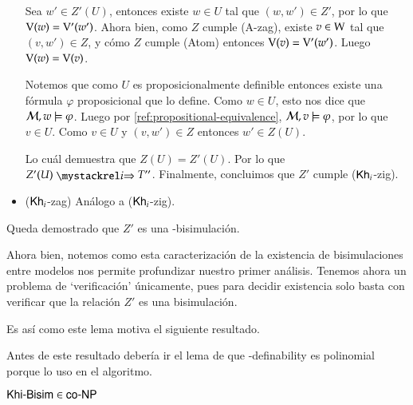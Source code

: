 \begin{demostracion}
\begin{itemize}
        Sea $w' \in Z'(U)$, entonces existe $w \in U$ tal que $(w,w') \in Z'$, por lo que $\mathrm{V}(w) = \mathrm{V}'(w')$. 
        Ahora bien, como $Z$ cumple (A-zag), existe $v \in \mathrm{W}$ tal que $(v,w') \in Z$, y cómo $Z$ cumple 
        (Atom) entonces $\mathrm{V}(v) = \mathrm{V}'(w')$. Luego $\mathrm{V}(w) = \mathrm{V}(v)$.
    
        Notemos que como $U$ es proposicionalmente definible entonces existe una fórmula $\varphi$ 
        proposicional que lo define. Como $w \in U$, esto nos dice que $\mathcal{M}, w \models \varphi$. 
        Luego por \ref{ref:propositional-equivalence}, $\mathcal{M}, v \models \varphi$, por lo que $v \in U$. Como $v \in U$ y $(v,w') \in Z$ 
        entonces $w' \in Z(U)$.
    
        Lo cuál demuestra que $Z(U) = Z'(U)$. Por lo que $Z'(U) \ultsExecAgi T''$. Finalmente, concluimos 
        que $Z'$ cumple ($\mathsf{Kh}_i$-zig).
    
    
        \item ($\mathsf{Kh}_i$-zag) Análogo a ($\mathsf{Kh}_i$-zig).
    \end{itemize}
    
    Queda demostrado que $Z'$ es una \KHilogic-bisimulación.
\end{demostracion}

Ahora bien, notemos como esta caracterización de la existencia de bisimulaciones entre modelos
nos permite profundizar nuestro primer análisis. Tenemos ahora un problema de `verificación'
únicamente, pues para decidir existencia solo basta con verificar que la relación $Z'$ es una bisimulación.

Es así como este lema motiva el siguiente resultado. 

Antes de este resultado debería ir el lema de que \KHilogic-definability es polinomial porque lo uso en el algoritmo. 


\begin{lema}
    $\rm\textsf{Khi-Bisim} \in \rm\textsf{co-NP}$ 
\end{lema}

